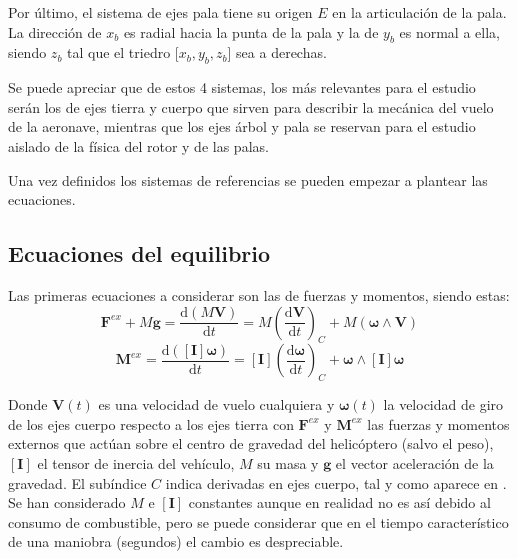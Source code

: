 Por último, el sistema de ejes pala tiene su origen $E$ en la articulación de la pala. La dirección de $x_{b}$ es radial hacia la punta de la pala y la de $y_{b}$ es normal a ella, siendo $z_{b}$ tal que el triedro [$x_{b},y_{b},z_{b}$] sea a derechas.

Se puede apreciar que de estos 4 sistemas, los más relevantes para el estudio serán los de ejes tierra y cuerpo que sirven para describir la mecánica del vuelo de la aeronave, mientras que los ejes árbol y pala se reservan para el estudio aislado de la física del rotor y de las palas.\

Una vez definidos los sistemas de referencias se pueden empezar a plantear las ecuaciones.

\subsection{Ecuaciones del equilibrio}
Las primeras ecuaciones a considerar  son las de fuerzas y momentos, siendo estas:
\begin{equation}
\mathrm{\textbf{F}}^{ex}+M\mathrm{\textbf{g}}=\frac{\mathrm{d}(M\mathrm{\textbf{V}})}{\mathrm{d}t}=M\left(\frac{\mathrm{d\textbf{V}}}{\mathrm{d}t}\right)_{C}+M(\boldsymbol{\omega}\wedge\mathrm{\textbf{V}})
\label{EqF}
\end{equation}
\begin{equation}
\mathrm{\textbf{M}}^{ex}=\frac{\mathrm{d}([\mathrm{\textbf{I}}]\boldsymbol{\omega})}{\mathrm{d}t}=[\mathrm{\textbf{I}}]\left(\frac{\mathrm{d}\boldsymbol{\omega}}{\mathrm{d}t}\right)_C+\boldsymbol{\omega}\wedge[\mathrm{\textbf{I}}]\boldsymbol{\omega}
\label{EqM}
\end{equation}

Donde $\mathrm{\textbf{V}}(t)$ es una velocidad de vuelo cualquiera y $\boldsymbol{\omega}(t)$ la velocidad de giro de los ejes cuerpo respecto a los ejes tierra con $\mathrm{\textbf{F}}^{ex}$ y $\mathrm{\textbf{M}}^{ex}$ las fuerzas y momentos externos que actúan sobre el centro de gravedad del helicóptero (salvo el peso), $[\mathrm{\textbf{I}}]$ el tensor de inercia del vehículo, $M$ su masa y $\mathrm{\textbf{g}}$ el vector aceleración de la gravedad. El subíndice $C$ indica derivadas en ejes cuerpo, tal y como aparece en \citet{Cuerva}. Se han considerado $M$ e $[\mathrm{\textbf{I}}]$ constantes aunque en realidad no es así debido al consumo de combustible, pero se puede considerar que en el tiempo característico de una maniobra (segundos) el cambio es despreciable.\\

